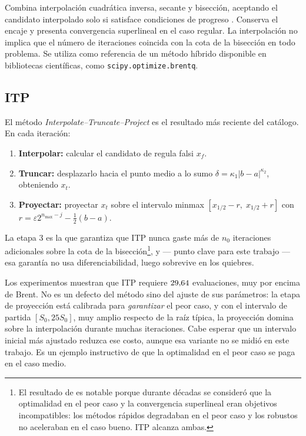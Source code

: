 Combina interpolación cuadrática inversa, secante y bisección, aceptando el
candidato interpolado solo si satisface condiciones de progreso
\citep{brent1973}. Conserva el encaje y presenta convergencia superlineal en
el caso regular. La interpolación no implica que el número de iteraciones
coincida con la cota de la bisección en todo problema. Se utiliza como
referencia de un método híbrido disponible en bibliotecas científicas, como
\texttt{scipy.optimize.brentq}.

\subsection{ITP}

El método \emph{Interpolate--Truncate--Project} \citep{oliveira2021} es el
resultado más reciente del catálogo. En cada iteración:
\begin{enumerate}[nosep,leftmargin=*]
  \item \textbf{Interpolar:} calcular el candidato de regula falsi $x_f$.
  \item \textbf{Truncar:} desplazarlo hacia el punto medio a lo sumo
        $\delta=\kappa_1|b-a|^{\kappa_2}$, obteniendo $x_t$.
  \item \textbf{Proyectar:} proyectar $x_t$ sobre el intervalo minmax
        $[x_{1/2}-r,\;x_{1/2}+r]$ con
        $r=\varepsilon 2^{n_{\max}-j}-\tfrac12(b-a)$.
\end{enumerate}
La etapa 3 es la que garantiza que ITP nunca gaste más de $n_0$ iteraciones
adicionales sobre la cota de la bisección\footnote{El resultado de \citet{oliveira2021} es notable porque durante décadas se consideró que la optimalidad en el peor caso y la convergencia superlineal eran objetivos incompatibles: los métodos rápidos degradaban en el peor caso y los robustos no aceleraban en el caso bueno. ITP alcanza ambas.}, y --- punto clave para este trabajo ---
esa garantía no usa diferenciabilidad, luego sobrevive en los quiebres.

\begin{remark}
Los experimentos muestran que ITP requiere $29{,}64$ evaluaciones, muy por
encima de Brent. No es un defecto del método sino del ajuste de sus parámetros: la
etapa de proyección está calibrada para \emph{garantizar} el peor caso, y con el
intervalo de partida $[S_0,25S_0]$, muy amplio respecto de la raíz típica, la
proyección domina sobre la interpolación durante muchas iteraciones. Cabe
esperar que un intervalo inicial más ajustado reduzca ese costo, aunque esa
variante no se midió en este trabajo. Es un ejemplo instructivo de que la optimalidad en el peor caso se paga en el caso
medio.
\end{remark}

